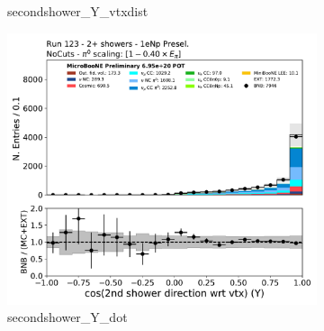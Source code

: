 \begin{figure}[H]
\begin{subfigure}{0.3\textwidth}
    \caption{secondshower\_Y\_vtxdist}
    \end{subfigure}
    \begin{subfigure}{0.3\textwidth}
    \includegraphics[width=1.0\textwidth]{Sidebands/Figures/1eNp/TwoShower/TwoPShr_NP_None_pi0e040/secondshower_Y_dot.pdf}
    \caption{secondshower\_Y\_dot}
    \end{subfigure}
    \caption{} 
    \label{fig:TWOP_1eNp_4}
\end{figure}

